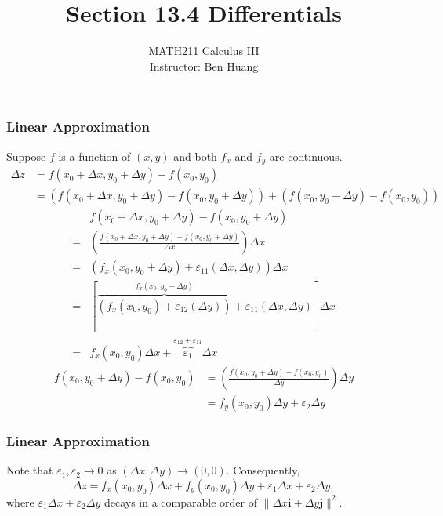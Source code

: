 \documentclass[10pt]{beamer}
\author[B.H.]{{\Large MATH211 Calculus III}\\\vspace{6pt}Instructor: Ben Huang}
\date{}
\title[Section 14.3]{Section 13.4 Differentials}
\institute[MU]{\texttt{[image: MCLogo-Bck.png]}}
\newcommand{\norm}[1]{\lVert#1\rVert}
\begin{document}
\frame{\titlepage}

\begin{frame}
\frametitle{Linear Approximation}
\small
Suppose \(f\) is a function of \((x,y)\) and both \(f_x\) and \(f_y\) are continuous.
\begin{align*}
\Delta z &= f(x_0+\Delta x, y_0 + \Delta y) - f(x_0,y_0)\\
& = \left(f(x_0+\Delta x, y_0 + \Delta y) - f(x_0, y_0+\Delta y)\right) + \left(f(x_0, y_0+\Delta y) - f(x_0,y_0)\right)
\end{align*}
\begin{align*}
&f(x_0+\Delta x, y_0 + \Delta y) - f(x_0, y_0+\Delta y)\\  
= &\left(\frac{
f(x_0+\Delta x, y_0 + \Delta y) - f(x_0, y_0+\Delta y) }{\Delta x}\right)\Delta x\\
=&\left(f_x(x_0, y_0+\Delta y) + \varepsilon_{11}(\Delta x, \Delta y)\right)\Delta x\\
=&\left[\overbrace{\left(f_x(x_0, y_0) +\varepsilon_{12}(\Delta y)\right)}^{f_x(x_0, y_0+\Delta y)} + \varepsilon_{11}(\Delta x, \Delta y)\right]\Delta x\\
=&f_x(x_0,y_0)\Delta x + \overbrace{\varepsilon_1}^{\varepsilon_{12} + \varepsilon_{11}}\Delta x
\end{align*}
\begin{align*}
f(x_0, y_0+\Delta y) - f(x_0,y_0)&=\left(\frac{f(x_0, y_0+\Delta y) - f(x_0,y_0)}{\Delta y}\right)\Delta y\\
&=f_y(x_0,y_0)\Delta y + \varepsilon_2\Delta y
\end{align*}
\end{frame}

\begin{frame}
\frametitle{Linear Approximation}
Note that $\varepsilon_1, \varepsilon_2 \to 0$ as $(\Delta x, \Delta y)\to (0,0)$. Consequently, 
\[
\Delta z = f_x(x_0,y_0)\Delta x + f_y(x_0,y_0)\Delta y + \varepsilon_1\Delta x + \varepsilon_2\Delta y,
\]
where \(\varepsilon_1\Delta x + \varepsilon_2\Delta y\) decays in a comparable order of $\norm{\Delta x\mathbf i + \Delta y\mathbf j}^2$.
\end{frame}
\end{document}
